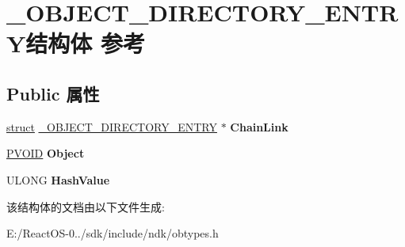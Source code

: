 \hypertarget{struct___o_b_j_e_c_t___d_i_r_e_c_t_o_r_y___e_n_t_r_y}{}\section{\+\_\+\+O\+B\+J\+E\+C\+T\+\_\+\+D\+I\+R\+E\+C\+T\+O\+R\+Y\+\_\+\+E\+N\+T\+R\+Y结构体 参考}
\label{struct___o_b_j_e_c_t___d_i_r_e_c_t_o_r_y___e_n_t_r_y}
\subsection*{Public 属性}
\begin{DoxyCompactItemize}
\item 
\mbox{\label{struct___o_b_j_e_c_t___d_i_r_e_c_t_o_r_y___e_n_t_r_y_a962e4a489893a85cede0123740d7040b}} 
\hyperlink{interfacestruct}{struct} \hyperlink{struct___o_b_j_e_c_t___d_i_r_e_c_t_o_r_y___e_n_t_r_y}{\+\_\+\+O\+B\+J\+E\+C\+T\+\_\+\+D\+I\+R\+E\+C\+T\+O\+R\+Y\+\_\+\+E\+N\+T\+RY} $\ast$ {\bfseries Chain\+Link}
\item 
\mbox{\label{struct___o_b_j_e_c_t___d_i_r_e_c_t_o_r_y___e_n_t_r_y_af3b1ceb616d64eac127f9d2d0315e1f5}} 
\hyperlink{interfacevoid}{P\+V\+O\+ID} {\bfseries Object}
\item 
\mbox{\label{struct___o_b_j_e_c_t___d_i_r_e_c_t_o_r_y___e_n_t_r_y_a2cefb7b1228a7694e8dd8111bc5b7d91}} 
U\+L\+O\+NG {\bfseries Hash\+Value}
\end{DoxyCompactItemize}


该结构体的文档由以下文件生成\+:\begin{DoxyCompactItemize}
\item 
E\+:/\+React\+O\+S-\/0../sdk/include/ndk/obtypes.\+h\end{DoxyCompactItemize}
